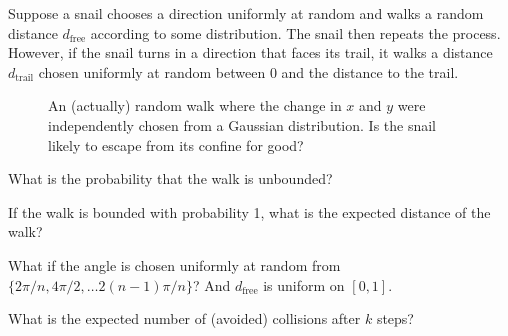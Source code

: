 \documentclass{article}
\begin{document}
  Suppose a snail chooses a direction uniformly at random and walks a random
  distance $d_\text{free}$ according to some distribution. The snail then
  repeats the process. However, if the snail turns in a direction that faces its
  trail, it walks a distance $d_\text{trail}$ chosen uniformly at random between
  0 and the distance to the trail.
  \begin{figure}[ht!]
    \centering
    \caption{
      An (actually) random walk where the change in $x$ and $y$ were
      independently chosen from a Gaussian distribution. Is the snail likely to
      escape from its confine for good?
    }
  \end{figure}
  \begin{question}
    What is the probability that the walk is unbounded?
  \end{question}

  \begin{related}
    \item If the walk is bounded with probability 1, what is the expected
      distance of the walk?
    \item What if the angle is chosen uniformly at random from
      $\{2\pi/n, 4\pi/2, \hdots 2(n-1)\pi/n\}$? And $d_\text{free}$ is uniform
      on $[0, 1]$.
    \item What is the expected number of (avoided) collisions after $k$ steps?
  \end{related}
\end{document}
